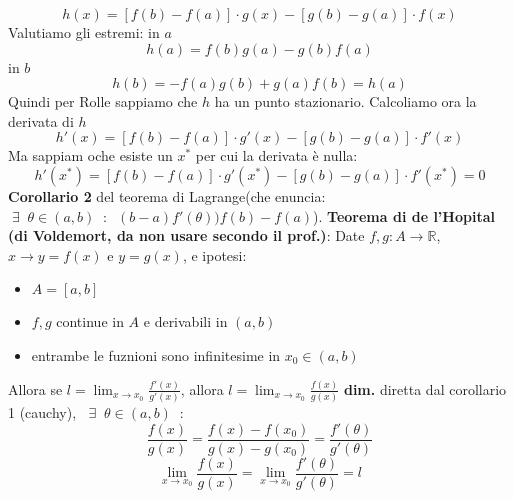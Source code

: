 \[
    h(x) = [f(b) - f(a)] \cdot  g(x) - [g(b) - g(a)] \cdot  f(x)
\]
Valutiamo gli estremi: in $a$
\[
    h(a) = f(b)g(a) - g(b)f(a)
\]
in $b$
\[
    h(b) = - f(a)g(b) + g(a)f(b) = h(a)
\]
Quindi per Rolle sappiamo che $h$ ha un punto stazionario. Calcoliamo ora la derivata di $h$
\[
    h'(x) = [f(b) - f(a)] \cdot  g'(x) - [g(b) - g(a) ]\cdot  f'(x)
\]
Ma sappiam oche esiste un $x^*$ per cui la derivata è nulla:
\[
    h'(x^*) = [f(b) - f(a)] \cdot  g'(x^*) - [g(b) - g(a) ]\cdot  f'(x^*) = 0
\]
\newline
\newline
\textbf{Corollario 2} del teorema di Lagrange(che enuncia:$\;\exists\;\; \theta \in (a,b) \;\;:\;\; (b-a) f'(\theta) ) f(b) - f(a)$). \textbf{Teorema di de l'Hopital (di Voldemort, da non usare secondo il prof.)}:\newline
Date $f, g: A \rightarrow \mathbb{R}$, $x \rightarrow y=f(x)$ e $y=g(x)$, e ipotesi:
\begin{itemize}
    \item $A = [a,b]$
    \item $f,g $ continue in $A$ e derivabili in $(a,b)$
    \item entrambe le fuznioni sono infinitesime in $x_0 \in (a,b)$
\end{itemize}
Allora se $l = \lim_{x\rightarrow x_0} \frac{ f'(x)}{g'(x)}$, allora $l = \lim_{x\rightarrow x_0} \frac{f(x)}{g(x)}$\newline
\newline
\textbf{dim.} diretta dal corollario 1 (cauchy), $\;\;\exists\;\; \theta \in (a,b) \;\;:\;\;$
\[
    \frac{f(x)}{g(x)} = \frac{f(x)-f(x_0)}{g(x)-g(x_0)} = \frac{f'(\theta)}{g'(\theta)}
\]
\[
    \lim_{x\rightarrow x_0} \frac{f(x)}{g(x)} = \lim_{x\rightarrow x_0} \frac{f'(\theta)}{g'(\theta)} = l
\]
\newline
\newline
\newline
